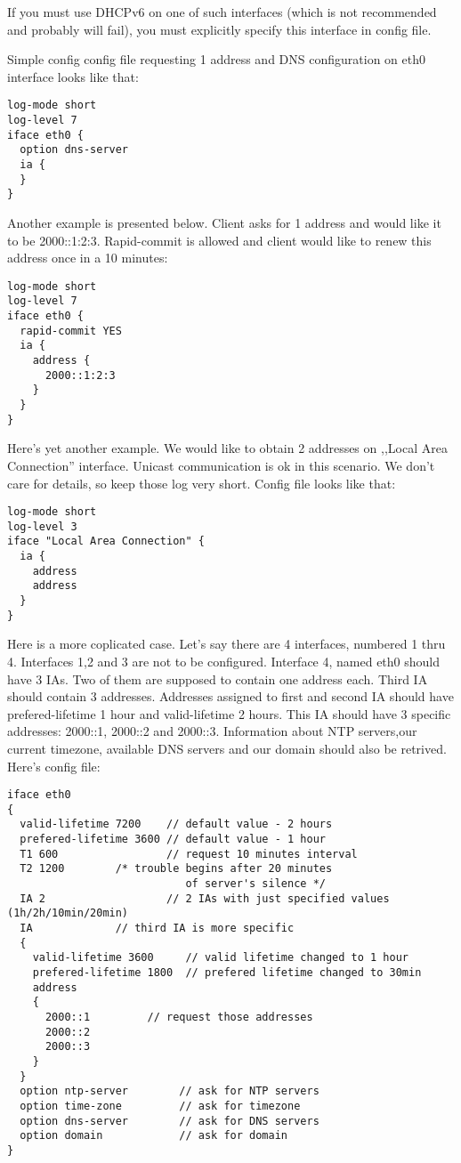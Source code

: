 If you must use DHCPv6 on one of such interfaces (which is not
recommended and probably will fail), you must explicitly specify this
interface in config file.

Simple config config file requesting 1 address and DNS configuration
on eth0 interface looks like that:
\begin{verbatim}
log-mode short
log-level 7
iface eth0 {
  option dns-server
  ia {
  }
}
\end{verbatim}

Another example is presented below. Client asks for 1 address and
would like it to be 2000::1:2:3. Rapid-commit is allowed and client
would like to renew this address once in a 10 minutes:

\begin{verbatim}
log-mode short
log-level 7
iface eth0 {
  rapid-commit YES
  ia {
    address { 
      2000::1:2:3
    }
  }
}
\end{verbatim}

Here's yet another example. We would like to obtain 2 addresses on
,,Local Area Connection'' interface. Unicast communication is ok in
this scenario. We don't care for details, so keep those log very
short. Config file looks like that:
\begin{verbatim}
log-mode short
log-level 3
iface "Local Area Connection" {
  ia {
    address
    address
  }
}
\end{verbatim}

Here is a more coplicated case. Let's say there are 4 interfaces,
numbered 1 thru 4. Interfaces 1,2 and 3 are not to be
configured. Interface 4, named eth0 should have 3 IAs. Two of them are
supposed to contain one address each. Third IA should contain 3
addresses. Addresses assigned to first and second IA should have
prefered-lifetime 1 hour and valid-lifetime 2 hours. This IA should
have 3 specific addresses: 2000::1, 2000::2 and 2000::3. Information
about NTP servers,our current timezone, available DNS servers and our
domain should also be retrived. Here's config file:

\begin{verbatim}
iface eth0
{
  valid-lifetime 7200    // default value - 2 hours
  prefered-lifetime 3600 // default value - 1 hour
  T1 600                 // request 10 minutes interval
  T2 1200		 /* trouble begins after 20 minutes
                            of server's silence */
  IA 2                   // 2 IAs with just specified values (1h/2h/10min/20min)
  IA			 // third IA is more specific
  {
    valid-lifetime 3600   	// valid lifetime changed to 1 hour
    prefered-lifetime 1800	// prefered lifetime changed to 30min
    address
    {			  
      2000::1		  // request those addresses
      2000::2             
      2000::3
    }
  }
  option ntp-server        // ask for NTP servers
  option time-zone         // ask for timezone
  option dns-server        // ask for DNS servers
  option domain            // ask for domain
}
\end{verbatim}

